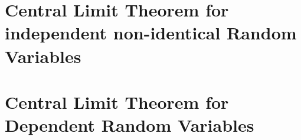 \section{Central Limit Theorem for independent non-identical Random Variables}

\begin{theorem}

\end{theorem}

\section{Central Limit Theorem for Dependent Random Variables}
